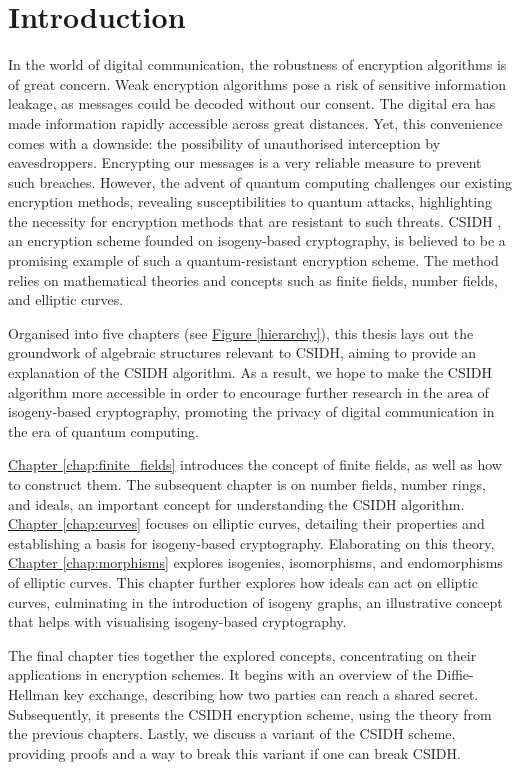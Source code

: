\documentclass[openany, a4paper, 10pt]{book}
\theoremstyle{plain}
\theoremstyle{plain}
\theoremstyle{plain}
\theoremstyle{definition}
\theoremstyle{plain}
\theoremstyle{definition}
\theoremstyle{remark}
\newcommand{\figref}[1]{\hyperref[#1]{Figure \ref{#1}}}
\newcommand{\chapref}[1]{\hyperref[#1]{Chapter \ref{#1}}}
\begin{document}
\chapter*{Introduction}
In the world of digital communication, the robustness of encryption algorithms is of great concern.
Weak encryption algorithms pose a risk of sensitive information leakage, as messages could be decoded without our consent.
The digital era has made information rapidly accessible across great distances.
Yet, this convenience comes with a downside: the possibility of unauthorised interception by eavesdroppers.
Encrypting our messages is a very reliable measure to prevent such breaches.
However, the advent of quantum computing challenges our existing encryption methods, revealing susceptibilities to quantum attacks, highlighting the necessity for encryption methods that are resistant to such threats.
CSIDH \cite{CSIDH}, an encryption scheme founded on isogeny-based cryptography, is believed to be a promising example of such a quantum-resistant encryption scheme.
The method relies on mathematical theories and concepts such as finite fields, number fields, and elliptic curves.

Organised into five chapters (see \figref{hierarchy}), this thesis lays out the groundwork of algebraic structures relevant to CSIDH, aiming to provide an explanation of the CSIDH algorithm.
As a result, we hope to make the CSIDH algorithm more accessible in order to encourage further research in the area of isogeny-based cryptography, promoting the privacy of digital communication in the era of quantum computing.

\chapref{chap:finite_fields} introduces the concept of finite fields, as well as how to construct them.
The subsequent chapter is on number fields, number rings, and ideals, an important concept for understanding the CSIDH algorithm.
\chapref{chap:curves} focuses on elliptic curves, detailing their properties and establishing a basis for isogeny-based cryptography.
Elaborating on this theory, \chapref{chap:morphisms} explores isogenies, isomorphisms, and endomorphisms of elliptic curves.
This chapter further explores how ideals can act on elliptic curves, culminating in the introduction of isogeny graphs, an illustrative concept that helps with visualising isogeny-based cryptography.

The final chapter ties together the explored concepts, concentrating on their applications in encryption schemes.
It begins with an overview of the Diffie-Hellman key exchange, describing how two parties can reach a shared secret.
Subsequently, it presents the CSIDH encryption scheme, using the theory from the previous chapters.
Lastly, we discuss a variant of the CSIDH scheme, providing proofs and a way to break this variant if one can break CSIDH.
\end{document}

